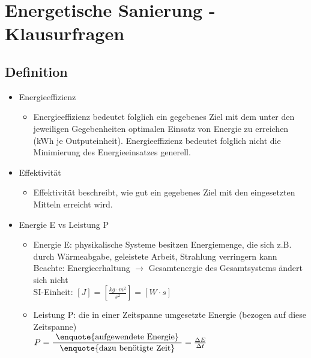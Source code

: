 \documentclass[fleqn,twoside,dvipsnames]{article}
\begin{document}
\newpage

\section{Energetische Sanierung - Klausurfragen}
    \subsection{Definition}
                \begin{itemize}
                    \item Energieeffizienz
                        \begin{itemize}
                            \item Energieeffizienz bedeutet folglich ein gegebenes Ziel mit dem unter den jeweiligen Gegebenheiten optimalen Einsatz von Energie zu erreichen (kWh je Outputeinheit). Energieeffizienz bedeutet folglich nicht die Minimierung des Energieeinsatzes generell.
                        \end{itemize}
                    \item Effektivität
                        \begin{itemize}
                            \item Effektivität beschreibt, wie gut ein gegebenes Ziel mit den eingesetzten Mitteln erreicht wird.
                        \end{itemize}
                    \item Energie E vs Leistung P
                        \begin{itemize}
                            \item Energie E: physikalische Systeme besitzen Energiemenge, die sich z.B. durch Wärmeabgabe, geleistete Arbeit, Strahlung verringern kann\\
                            Beachte: Energieerhaltung $\rightarrow$ Gesamtenergie des Gesamtsystems ändert sich nicht\\
                            SI-Einheit: $[J]=\left[\frac{k g \cdot m^2}{s^2}\right]=[W \cdot s]$ \vspace{2mm}
                            \item Leistung P: die in einer Zeitspanne umgesetzte Energie (bezogen auf diese Zeitspanne)\\
                            $P=\dfrac{\text { \enquote{aufgewendete Energie} }}{\text { \enquote{dazu benötigte Zeit} }}=\frac{\Delta E}{\Delta t} $\\

\end{itemize}
\end{itemize}
\end{document}
